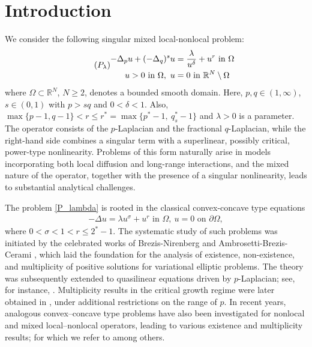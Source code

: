 \documentclass[reqno,oneside]{amsart}
\theoremstyle{definition}
\theoremstyle{remark}
\numberwithin{equation}{section}
\newcommand{\Om} {\Omega}
\newcommand{\sr}{\mathbb{R}}
\newcommand{\De} {\Delta}
\newcommand{\p}{\Delta_p}
\newcommand{\qs}{(-\Delta_q)^s}
\newcommand{\bdry}{\mathbb{R}^N \setminus \Omega}
\newcommand{\la} {\lambda}
\begin{document}
\maketitle

\section{Introduction}

We consider the following singular mixed local-nonlocal problem:
\begin{equation}\tag{$P_{\la}$}\label{P_lambda}
    \begin{aligned}
        -\p u + \qs u &= \frac{\la}{u^{\delta}} + u^r \text{ in } \Om\\
        u>0 \text{ in } \Om,\ u &=0 \text{ in } \bdry
    \end{aligned}
\end{equation}
where $\Om \subset \sr^N$, $N\geq 2$, denotes a bounded smooth domain. Here, $p,q \in (1, \infty)$, $s\in (0,1)$ with  $p>sq$ and $0< \delta <1$. Also, $\max \{ p-1, q-1\} < r \leq r^*= \max \{p^* -1,\ q_s^* -1 \}$ and $\la>0$ is a parameter. The operator consists of the $p$-Laplacian and the fractional $q$-Laplacian, while the right-hand side combines a singular term with a superlinear, possibly critical, power-type nonlinearity. Problems of this form naturally arise in models incorporating both local diffusion and long-range interactions, and the mixed nature of the operator, together with the presence of a singular nonlinearity, leads to substantial analytical challenges.

The problem \eqref{P_lambda} is rooted in the classical convex-concave type equations
\begin{align}\label{eqn1.1}
    -\De u = \la u^{\sigma} + u^r \text{ in } \Om,\ u=0 \text{ on } \partial \Omega,
\end{align}
where $0<\sigma<1<r \leq 2^* -1$. The systematic study of such problems was initiated by the celebrated works of Brezis-Nirenberg \cite{brezis1983existence} and Ambrosetti-Brezis-Cerami \cite{ambrosetti1994convexconcave}, which laid the foundation for the analysis of existence, non-existence, and multiplicity of positive solutions for variational elliptic problems. The theory was subsequently extended to quasilinear equations driven by $p$-Laplacian; see, for instance, \cite{ambrosettigarciaperal1996multiplicity}. Multiplicity results in the critical growth regime were later obtained in \cite{garcia1994critical, garcia2000minimizer}, under additional restrictions on the range of $p$. In recent years, analogous convex–concave type problems have also been investigated for nonlocal and mixed local–nonlocal operators, leading to various existence and multiplicity results; for which we refer to \cite{brandle2013fractional, barrios2015convexconcave, weisu2015fractional, yezhang2024multiplicity, silva2024mixed, biagi2025convexconcave, dhanya2025multiplicityresultsmixedlocal, bhakta2025quasilinearproblemsmixedlocalnonlocal} among others.
\end{document}
